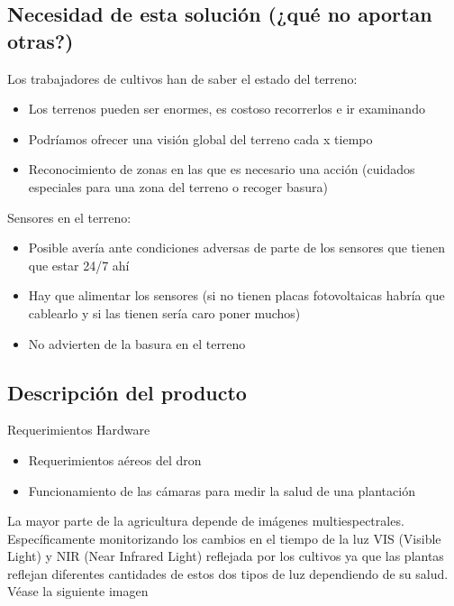 \documentclass[11pt,spanish]{article} %
\begin{document}
\subsection{Necesidad de esta solución (¿qué no aportan otras?)}
Los trabajadores de cultivos han de saber el estado del terreno:
\begin{itemize}
	\item Los terrenos pueden ser enormes, es costoso recorrerlos e ir examinando 
	\item Podríamos ofrecer una visión global del terreno cada x tiempo
	\item Reconocimiento de zonas en las que es necesario una acción (cuidados especiales para una zona del terreno o recoger basura)
\end{itemize}

Sensores en el terreno:
\begin{itemize}
	\item Posible avería ante condiciones adversas de parte de los sensores que tienen que estar 24/7 ahí %
	\item Hay que alimentar los sensores (si no tienen placas fotovoltaicas habría que cablearlo y si las tienen sería caro poner muchos)
	\item No advierten de la basura en el terreno
\end{itemize}


\subsection{Descripción del producto}
Requerimientos Hardware %

\begin{itemize}
	\item Requerimientos aéreos del dron
	\item Funcionamiento de las cámaras para medir la salud de una plantación
\end{itemize}

La mayor parte de la agricultura depende de imágenes multiespectrales. Específicamente monitorizando los cambios en el tiempo de la luz VIS (Visible Light) y NIR (Near Infrared Light) reflejada por los cultivos ya que las plantas reflejan diferentes cantidades de estos dos tipos de luz dependiendo de su salud. Véase la siguiente imagen  %


\end{document}
